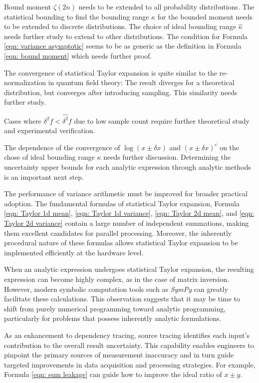 \documentclass[twoside]{article}
\numberwithin{equation}{section}
\begin{document}
Bound moment $\zeta(2n)$ needs to be extended to all probability distributions.
The statistical bounding to find the bounding range $\kappa$ for the bounded moment needs to be extended to discrete distributions.
The choice of ideal bounding range $\hat{\kappa}$ needs further study to extend to other distributions.
The condition for Formula \eqref{eqn: variance asymptotic} seems to be as generic as the definition in Formula \eqref{eqn: bound moment} which needs further proof.

The convergence of statistical Taylor expansion is quite similar to the re-normalization in quantum field theory: 
The result diverges for a theoretical distribution, but converges after introducing sampling.
This similarity needs further study.

Cases where $\delta^2 f < \widehat{\delta^2} f$ due to low sample count require further theoretical study and experimental verification.

The dependence of the convergence of $\log(x \pm \delta x)$ and $(x \pm \delta x)^c$ on the chose of ideal bounding range $\kappa$ needs further discussion.
Determining the uncertainty upper bounds for each analytic expression through analytic methods is an important next step.

The performance of variance arithmetic must be improved for broader practical adoption.
The fundamental formulas of statistical Taylor expansion, Formula \eqref{eqn: Taylor 1d mean}, \eqref{eqn: Taylor 1d variance}, \eqref{eqn: Taylor 2d mean}, and \eqref{eqn: Taylor 2d variance} contain a large number of independent summations, making them excellent candidates for parallel processing.
Moreover, the inherently procedural nature of these formulas allows statistical Taylor expansion to be implemented efficiently at the hardware level.

When an analytic expression undergoes statistical Taylor expansion, the resulting expression can become highly complex, as in the case of matrix inversion.
However, modern symbolic computation tools such as \textit{SymPy} can greatly facilitate these calculations.
This observation suggests that it may be time to shift from purely numerical programming toward analytic programming, particularly for problems that possess  inherently analytic formulations.

As an enhancement to dependency tracing, source tracing identifies each input’s contribution to the overall result uncertainty.
This capability enables engineers to pinpoint the primary sources of measurement inaccuracy and in turn guide targeted improvements in data acquisition and processing strategies.
For example, Formula \eqref{eqn: sum leakage} can guide how to improve the ideal ratio of $x \pm y$.
\end{document}
